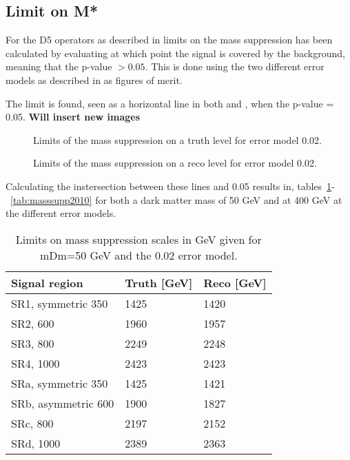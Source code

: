 \subsection{Limit on M*}\label{sec:res:subsec:m*}
For the D5 operators as described in  limits on the mass suppression has been calculated by evaluating at which point the signal is covered by the background, meaning that the p-value $>0.05$. This is done using the two different error models as described in  as figures of merit.

The limit is found, seen as a horizontal line in both  and , when the p-value = 0.05. \textbf{Will insert new images}

 \begin{figure}[H] %
    \hfill
    \caption{Limits of the mass suppression on a truth level for error model 0.02.}
    \label{fig:SRnewMt}
  \end{figure}

 \begin{figure}[H] %
    \hfill
    \caption{Limits of the mass suppression on a reco level for error model 0.02.}
    \label{fig:SRnewMr}
  \end{figure}

Calculating the instersection between these lines and 0.05 results in, tables~\ref{tab:masssupp002}-~\ref{tab:masssupp2010} for both a dark matter mass of 50 GeV and at 400 GeV at the different error models.

\begin{table}[ht]
\begin{center}
\begin{tabular}{|l|l|l|}
\hline
Signal region & Truth [GeV]& Reco [GeV]\\ \hline
SR1, symmetric 350&1425&1420\\
SR2, 600&1960&1957\\
SR3, 800&2249&2248\\
SR4, 1000&2423&2423\\ \hline
SRa, symmetric 350&1425&1421\\
SRb, asymmetric 600&1900&1827\\
SRc, 800&2197&2152\\
SRd, 1000&2389&2363\\ \hline
\end{tabular}
\caption{Limits on mass suppression scales in GeV given for mDm=50 GeV and the 0.02 error model.}
\label{tab:masssupp002}
\end{center}
\end{table}


